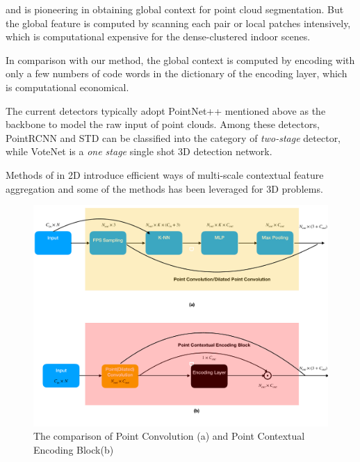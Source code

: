 \documentclass[runningheads]{llncs}
\begin{document}
\cite{ppfnet} and  \cite{LG-PointNet++} is pioneering in obtaining global context for 
point cloud segmentation.  But the global feature is computed by scanning each pair or local patches intensively, which is computational expensive for the dense-clustered indoor scenes.


In comparison with our method,  the global context is computed by encoding with only a few numbers of code words in the dictionary of the encoding layer, which is computational economical.




The current detectors  \cite{VoteNet,PointRCNN,STD} typically adopt PointNet++  mentioned above as the backbone to model the raw input of point clouds. Among these detectors, PointRCNN \cite{PointRCNN} and STD \cite{STD} can be classified into the category of \emph{two-stage} detector, %
while VoteNet \cite{VoteNet} is a \emph{one stage} single shot 3D detection network. 



Methods of \cite{Deeplabv1,Deeplabv3,Deeplabv3+,DenseASPP,largekernel,SENet,encnet} in 2D introduce efficient ways of multi-scale contextual feature aggregation and some of the methods has been leveraged for  3D problems.


\begin{figure}[t]
			\begin{minipage}{1\textwidth}
				\centering				\includegraphics[width=1.0\linewidth]{eccv2020kit/Figure/SA_layer.pdf}
			\end{minipage}
    \caption{The comparison of Point Convolution (a) and Point Contextual Encoding Block(b)}
    \label{fig:PointConv}
\end{figure}
\end{document}
